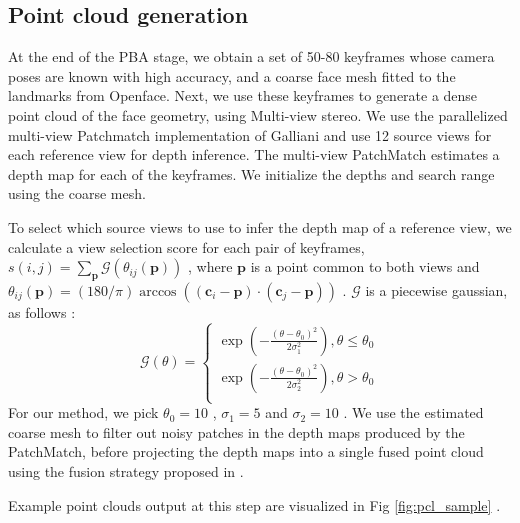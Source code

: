 \documentclass[10pt,twocolumn,letterpaper]{article}
\begin{document}
\subsection{Point cloud generation} \label{sec:pcl}

At the end of the PBA stage, we obtain a set of 50-80 keyframes whose camera poses are known with high accuracy, and a coarse face mesh fitted to the landmarks from Openface. Next, we use these keyframes to generate a dense point cloud of the face geometry, using Multi-view stereo.
 We use the parallelized multi-view Patchmatch implementation of Galliani \etal \cite{galliani2015massively} and use 12 source views for each reference view for depth inference. The multi-view PatchMatch estimates a depth map for each of the keyframes. We initialize the depths and search range using the coarse mesh.


To select which source views to use to infer the depth map of a reference view, we calculate a view selection score \cite{yao2018mvsnet} for each pair of keyframes, $s(i, j) = \sum_{\mathbf{p}} \mathcal{G}(\theta_{ij}(\mathbf{p}))$ , where $\mathbf{p}$ is a point common to both views and $\theta_{ij}(\mathbf{p}) = (180/\pi)\arccos((\mathbf{c}_i - \mathbf{p}) \cdot (\mathbf{c}_j - \mathbf{p}))$ . $\mathcal{G}$ is a piecewise gaussian, as follows :
\[ \mathcal{G}(\theta) =  \left\{
\begin{array}{ll}
      \exp(-\frac{(\theta - \theta_0)^2}{2\sigma_1^2}), \theta \leq \theta_0 \\
      \exp(-\frac{(\theta - \theta_0)^2}{2\sigma_2^2}), \theta > \theta_0 \\
\end{array} 
\right. \]
For our method, we pick $\theta_{0} =10 $  , $\sigma_{1} =5$  and $\sigma_2=10$  .
 We use the estimated coarse mesh to filter out noisy patches in the depth maps produced by the PatchMatch, before projecting the depth maps into a single fused point cloud using the fusion strategy proposed in \cite{galliani2015massively}.

Example point clouds output at this step are visualized in Fig \ref{fig:pcl_sample} . 
\end{document}
